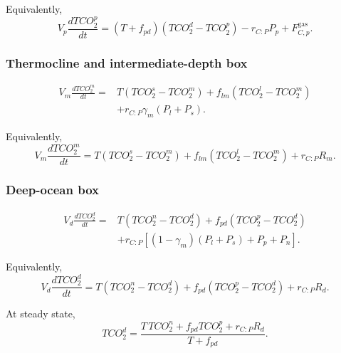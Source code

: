 \documentclass[11pt]{article}
\begin{document}
Equivalently,
\begin{equation}
V_p\frac{dTCO_2^p}{dt}
=
\left(T+f_{pd}\right)
\left(TCO_2^d-TCO_2^p\right)
-
r_{C:P}P_p
+
F^{\mathrm{gas}}_{C,p}.
\label{eq:six_tco2_p_compact}
\end{equation}

\subsubsection{Thermocline and intermediate-depth box}

\begin{equation}
\begin{split}
V_m\frac{dTCO_2^m}{dt}
={}&
T\left(TCO_2^s-TCO_2^m\right)
+
f_{lm}\left(TCO_2^l-TCO_2^m\right)
\\
&+
r_{C:P}\gamma_m\left(P_l+P_s\right).
\end{split}
\label{eq:six_tco2_m}
\end{equation}

Equivalently,
\begin{equation}
V_m\frac{dTCO_2^m}{dt}
=
T\left(TCO_2^s-TCO_2^m\right)
+
f_{lm}\left(TCO_2^l-TCO_2^m\right)
+
r_{C:P}R_m.
\label{eq:six_tco2_m_compact}
\end{equation}

\subsubsection{Deep-ocean box}

\begin{equation}
\begin{split}
V_d\frac{dTCO_2^d}{dt}
={}&
T\left(TCO_2^n-TCO_2^d\right)
+
f_{pd}\left(TCO_2^p-TCO_2^d\right)
\\
&+
r_{C:P}
\left[
\left(1-\gamma_m\right)
\left(P_l+P_s\right)
+
P_p+P_n
\right].
\end{split}
\label{eq:six_tco2_d}
\end{equation}

Equivalently,
\begin{equation}
V_d\frac{dTCO_2^d}{dt}
=
T\left(TCO_2^n-TCO_2^d\right)
+
f_{pd}\left(TCO_2^p-TCO_2^d\right)
+
r_{C:P}R_d.
\label{eq:six_tco2_d_compact}
\end{equation}

At steady state,
\begin{equation}
TCO_2^d
=
\frac{
T\,TCO_2^n
+
f_{pd}TCO_2^p
+
r_{C:P}R_d
}{
T+f_{pd}
}.
\label{eq:six_tco2_d_steady}
\end{equation}
\end{document}
